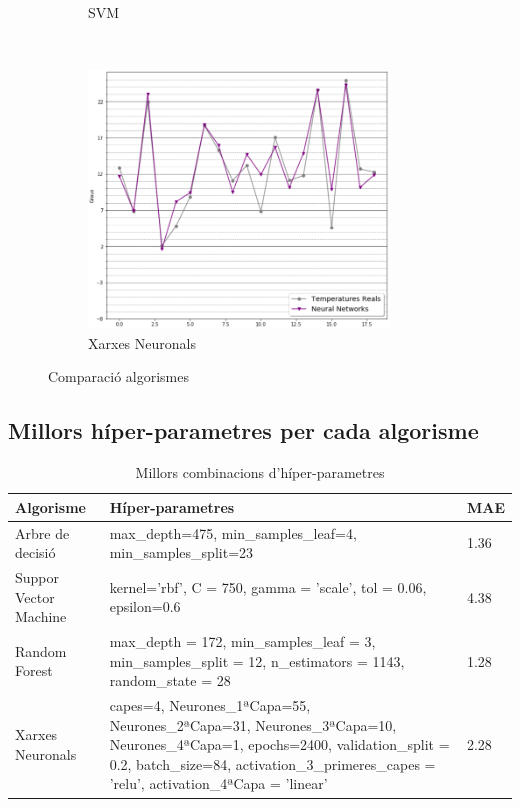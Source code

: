 \documentclass[10pt,a4paper,twocolumn,twoside]{article}
\begin{document}
\begin{figure}[htb!]
\begin{subfigure}[htb!]{0.5\textwidth}
	\caption{SVM}
	\label{fig-SVM}
    \end{subfigure}
    ~ %
    \begin{subfigure}[htb!]{0.5\textwidth}
	\includegraphics[width=80mm]{../img/XarxesNeurPredict}
	\caption{Xarxes Neuronals}
	\label{fig-NN}
    \end{subfigure}
    \caption{Comparació algorismes}\label{compAlgs}
\end{figure}
\clearpage
\subsection{Millors híper-parametres per cada algorisme}
\begin{table}[th]
\caption{Millors combinacions d'híper-parametres}
\begin{center}
\begin{tabular}{  P{3.5cm}| P{10cm} |P{1cm}}
\hline\hline 
\textbf{Algorisme} & \textbf{Híper-parametres} & \textbf{MAE}\\
\hline
Arbre de decisió & max\_depth=475, min\_samples\_leaf=4, min\_samples\_split=23 & 1.36 \\
\hline
Suppor Vector Machine & kernel='rbf', C = 750, gamma = 'scale', tol = 0.06, epsilon=0.6 & 4.38\\
\hline
Random Forest & max\_depth = 172, min\_samples\_leaf = 3, min\_samples\_split = 12, n\_estimators = 1143, random\_state = 28 & 1.28\\
\hline
Xarxes Neuronals & capes=4, Neurones\_1ªCapa=55, Neurones\_2ªCapa=31, Neurones\_3ªCapa=10, Neurones\_4ªCapa=1, epochs=2400, validation\_split = 0.2, batch\_size=84, activation\_3\_primeres\_capes = 'relu', activation\_4ªCapa = 'linear' & 2.28\\
\hline
\hline
\end{tabular}
\end{center}
\end{table}
\end{document}
